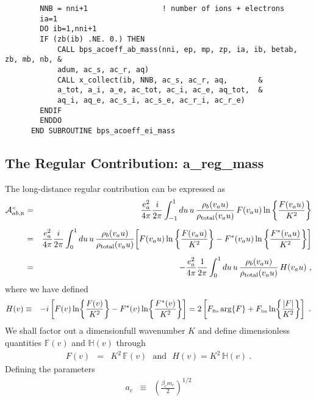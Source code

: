 \documentclass[preprint,12pt,eqsecnum,nofootinbib,amsmath,amssymb]{revtex4}
\newcommand{\smR}{{\rm\scriptscriptstyle R}}
\newcommand{\smRe}{{\rm\scriptscriptstyle Re}}
\newcommand{\smIm}{{\rm\scriptscriptstyle Im}}
\newcommand{\smLT}{{\rm\scriptscriptstyle <}}
\begin{document}
{{\begin{verbatim}
        NNB = nni+1                 ! number of ions + electrons
        ia=1
        DO ib=1,nni+1
        IF (zb(ib) .NE. 0.) THEN
            CALL bps_acoeff_ab_mass(nni, ep, mp, zp, ia, ib, betab, zb, mb, nb, &
            adum, ac_s, ac_r, aq)
            CALL x_collect(ib, NNB, ac_s, ac_r, aq,       &
            a_tot, a_i, a_e, ac_tot, ac_i, ac_e, aq_tot,  &
            aq_i, aq_e, ac_s_i, ac_s_e, ac_r_i, ac_r_e)
        ENDIF
        ENDDO
      END SUBROUTINE bps_acoeff_ei_mass
\end{verbatim}


\subsection{The Regular Contribution: a\_reg\_mass}


The long-distance regular contribution can be expressed as
\begin{eqnarray}
  {\cal A}^\smLT_{ab,\smR} 
  &=&
  \frac{e_a^2}{4\pi}
  \frac{i}{2\pi} \int_{-1}^1 du\,u\,
  \frac{\rho_b(v_a u)}{\rho_\text{total}(v_a u)}\,
  F(v_a u) \ln \left\{ \frac{F(v_a u)}{K^2} \right\}
\\[5pt]
  &=&
  \frac{e_a^2}{4\pi}
  \frac{i}{2\pi} \int_0^1 du\,u\,
  \frac{\rho_b(v_a u)}{\rho_\text{total}(v_a u)}\!
  \left[
  F(v_a u) \ln \left\{ \frac{F(v_a u)}{K^2} \right\}
  -
  F^*(v_a u) \ln \left\{ \frac{F^*(v_a u)}{K^2} \right\}
  \right]
\\[5pt]
  &=&
  -\frac{e_a^2}{4\pi}
  \frac{1}{2\pi} \int_0^1 du\,u\,
  \frac{\rho_b(v_a u)}{\rho_\text{total}(v_a u)}\, H(v_a u) \ ,
\end{eqnarray}
where we have defined
\begin{eqnarray}
  H(v) 
  &\equiv&
  -i\left[
  F(v) \ln\!\left\{ \frac{F(v)}{K^2}\right\} -
  F^*(v)\ln\!\left\{\frac{F^*(v)}{K^2} \right\}\right]
  =
  2\left[
  F_\smRe\, {\rm arg}\{F\}
  +
  F_{\smIm} \ln\!\left\{\frac{\vert F \vert}{K^2}\right\}
   \right] \ .
\nonumber\\
\label{Hbagain}
\end{eqnarray}
We shall factor out a dimensionfull wavenumber $K$ and define
dimensionless quantities $\mathbb{F}(v)$ and $\mathbb{H}(v)$
through
\begin{eqnarray}
  F(v) &=& K^2\,  \mathbb{F}(v) 
  ~~~\text{and}~~~
  H(v) = K^2\,  \mathbb{H}(v) \ .
\end{eqnarray}
Defining the parameters
\begin{eqnarray}
  a_c
  &\equiv&
  \left(\frac{\beta_c m_c}{2} \right)^{1/2}

\end{eqnarray}}}
\end{document}
